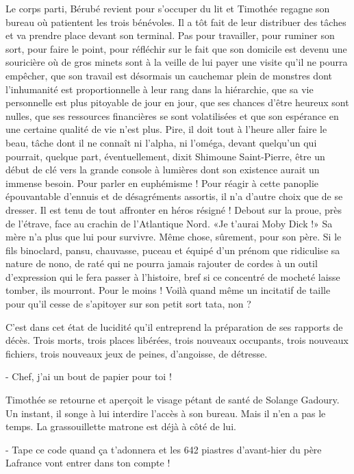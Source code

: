 Le corps parti, Bérubé revient pour s’occuper du lit et Timothée regagne son bureau où patientent les trois bénévoles. Il a tôt fait de leur distribuer des tâches et va prendre place devant son terminal. Pas pour travailler, pour ruminer son sort, pour faire le point, pour réfléchir sur le fait que son domicile est devenu une souricière où de gros minets sont à la veille de lui payer une visite qu’il ne pourra empêcher, que son travail est désormais un cauchemar plein de monstres dont l’inhumanité est proportionnelle à leur rang dans la hiérarchie, que sa vie personnelle est plus pitoyable de jour en jour, que ses chances d’être heureux sont nulles, que ses ressources financières se sont volatilisées et que son espérance en une certaine qualité de vie n’est plus. Pire, il doit tout à l’heure aller faire le beau, tâche dont il ne connaît ni l’alpha, ni l’oméga, devant quelqu’un qui pourrait, quelque part, éventuellement, dixit Shimoune Saint-Pierre, être un début de clé vers la grande console à lumières dont son existence aurait un immense besoin. Pour parler en euphémisme ! Pour réagir à cette panoplie épouvantable d’ennuis et de désagréments assortis, il n’a d’autre choix que de se dresser. Il est tenu de tout affronter en héros résigné ! Debout sur la proue, près de l’étrave, face au crachin de l’Atlantique Nord. «Je t’aurai Moby Dick !» Sa mère n’a plus que lui pour survivre. Même chose, sûrement, pour son père. Si le fils binoclard, pansu, chauvasse, puceau et équipé d’un prénom que ridiculise sa nature de nono, de raté qui ne pourra jamais rajouter de cordes à un outil d’expression qui le fera passer à l’histoire, bref si ce concentré de mocheté laisse tomber, ils mourront. Pour le moins ! Voilà quand même un incitatif de taille pour qu’il cesse de s’apitoyer sur son petit sort tata, non ?

C’est dans cet état de lucidité qu’il entreprend la préparation de ses rapports de décès. Trois morts, trois places libérées, trois nouveaux occupants, trois nouveaux fichiers, trois nouveaux jeux de peines, d’angoisse, de détresse.

- Chef, j’ai un bout de papier pour toi !

Timothée se retourne et aperçoit le visage pétant de santé de Solange Gadoury. Un instant, il songe à lui interdire l’accès à son bureau. Mais il n’en a pas le temps. La grassouillette matrone est déjà à côté de lui.

- Tape ce code quand ça t’adonnera et les 642 piastres d’avant-hier du père Lafrance vont entrer dans ton compte !

